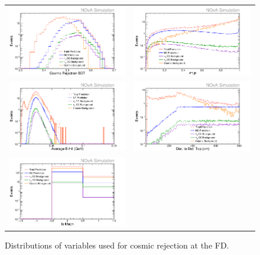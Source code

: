 \begin{figure}[h]
  \centering
  \begin{tabular}{c c}
    \includegraphics[width=.48\textwidth]{figures/NP1NmCP.png} &
    \includegraphics[width=.48\textwidth]{figures/NP1PPTP.png} \\
    \includegraphics[width=.48\textwidth]{figures/NP1EHit.png} &
    \includegraphics[width=.48\textwidth]{figures/NP1DistTop.png} \\
    \includegraphics[width=.48\textwidth]{figures/NP1IsMu.png} & \\
  \end{tabular}
  \caption[Cosmic Rejection Variable Distributions]{Distributions of variables used for cosmic rejection at the FD.}
  \label{fig:CosRej}
\end{figure}

